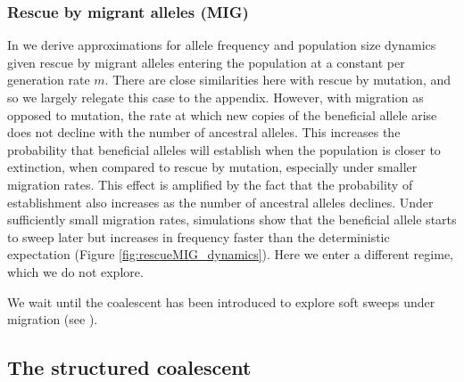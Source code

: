 \documentclass[]{article}
\begin{document}
\subsubsection*{Rescue by migrant alleles (MIG)}
\label{sec:rescue_forward_mig_main}

In  we derive approximations for allele frequency and population size dynamics given rescue by migrant alleles entering the population at a constant per generation rate $m$.
There are close similarities here with rescue by mutation, and so we largely relegate this case to the appendix.
However, with migration as opposed to mutation, the rate at which new copies of the beneficial allele arise does not decline with the number of ancestral alleles.
This increases the probability that beneficial alleles will establish when the population is closer to extinction, when compared to rescue by mutation, especially under smaller migration rates.
This effect is amplified by the fact that the probability of establishment also increases as the number of ancestral alleles declines.
Under sufficiently small migration rates, simulations show that the beneficial allele starts to sweep later but increases in frequency faster than the deterministic expectation (Figure \ref{fig:rescueMIG_dynamics}).
Here we enter a different regime, which we do not explore.

We wait until the coalescent has been introduced to explore soft sweeps under migration (see ).

\subsection*{The structured coalescent}
\label{sec:rescue_backward}
\end{document}
